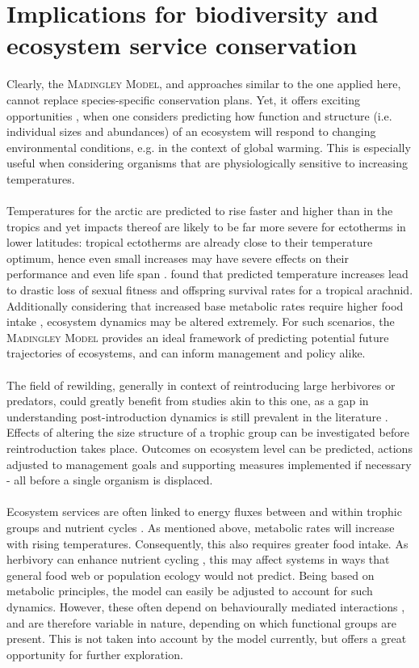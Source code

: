 \section{Implications for biodiversity and ecosystem service conservation }
Clearly, the \textsc{Madingley Model}, and approaches similar to the one applied here, cannot replace species-specific conservation  plans. Yet, it offers exciting opportunities , when one considers predicting how function and structure (i.e. individual sizes and abundances) of an ecosystem will respond to changing environmental conditions, e.g. in the context of global warming. This is especially useful when considering organisms that are physiologically sensitive to increasing temperatures.\\\\
Temperatures for the arctic are predicted to rise faster and higher than in the tropics   and yet impacts thereof are likely to be far more severe for ectotherms in lower latitudes: tropical ectotherms are already close to their temperature optimum, hence even small increases may have severe effects on their performance \citep{Deutsch2008} and even life span \citep[cf.][]{Speakman2005}. \cite{Zeh2012} found that predicted temperature increases lead to drastic loss of sexual fitness and offspring survival rates for a tropical arachnid. Additionally considering that increased base metabolic rates require higher food intake \citep{Dillon2010}, ecosystem dynamics may be altered extremely. For such scenarios, the \textsc{Madingley Model} provides an ideal framework of predicting potential future trajectories of ecosystems, and  can inform management and policy alike.\\\\
The field of rewilding, generally in context of reintroducing large herbivores or predators, could greatly benefit from studies akin to this one, as a gap in understanding post-introduction dynamics is still prevalent in the literature \citep[e.g.][]{Grange2012,Smit2015}. Effects of altering the size structure of a trophic group can be investigated before reintroduction takes place. Outcomes on ecosystem level can be predicted, actions adjusted to management goals and supporting measures implemented if necessary - all before a single organism is displaced. \\\\ 
Ecosystem services are often linked to energy fluxes between and within trophic groups and nutrient cycles \citep{Cardinale2012}. As mentioned above, metabolic rates will increase with rising temperatures. Consequently, this also requires greater food intake. As herbivory can enhance nutrient cycling \citep{Belovsky2000}, this may affect systems in ways that general food web or population ecology would not predict. Being based on metabolic principles, the model can easily be adjusted to account for such dynamics. However, these often depend on behaviourally mediated interactions \cite{Hawlena2010}, and are therefore variable in nature, depending on which functional groups are present. This is not taken into account by the model currently, but offers a great opportunity for further exploration.
